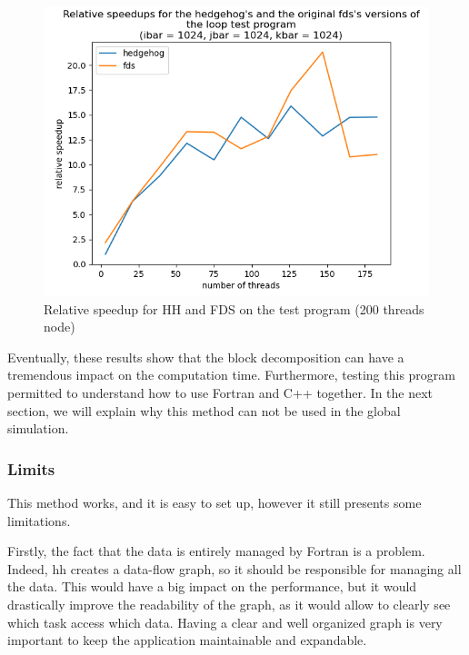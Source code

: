 \begin{figure}[ht!]
  \begin{center}
    \includegraphics[scale=0.6]{img/fds-loops/relative_speedup.png}
    \caption{Relative speedup for HH and FDS on the test program (200 threads node)}
    \label{fig:loopsrelativespeedup}
  \end{center}
\end{figure}

Eventually, these results show that the block decomposition can have a
tremendous impact on the computation time. Furthermore, testing this program
permitted to understand how to use Fortran and C++ together. In the next
section, we will explain why this method can not be used in the global
simulation.

\subsubsection{Limits}

This method works, and it is easy to set up, however it still presents some
limitations.

Firstly, the fact that the data is entirely managed by Fortran is a problem.
Indeed, \gls{hh} creates a data-flow graph, so it should be responsible for
managing all the data. This would have a big impact on the performance, but it
would drastically improve the readability of the graph, as it would allow to
clearly see which task access which data. Having a clear and well organized
graph is very important to keep the application maintainable and expandable.

